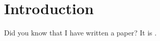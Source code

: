 
\section{Introduction}
Did you know that I have written a paper? It is \cite{Kollenda2021}.\\

\lipsum[2]